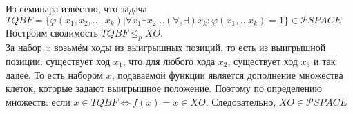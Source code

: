 \documentclass[a4paper,12pt]{article} %
\begin{document}
Из семинара известно, что задача\\
$TQBF = \{\varphi(x_1, x_2, \dotsc, x_k) | \forall x_1 \exists x_2 \dotsc (\forall, \exists) x_k: \varphi(x_1, \dotsc x_k) = 1\} \in \mathcal{P}SPACE$\\
Построим сводимость $ TQBF \leq_p XO $.\\  За набор $ x $ возьмём ходы из выигрышных позиций, то есть из выигрышной позиции: существует ход $ x_1 $, что для любого хода $ x_2 $, существует ход $ x_3 $ и так далее. То есть набором $ x $, подаваемой функции является дополнение множества клеток, которые задают выигрышное положение. Поэтому по определению множеств: если $ x \in TQBF \Longleftrightarrow f(x)=x \in XO  $. Следовательно, $ XO \in \mathcal{P}SPACE$
\end{document}
